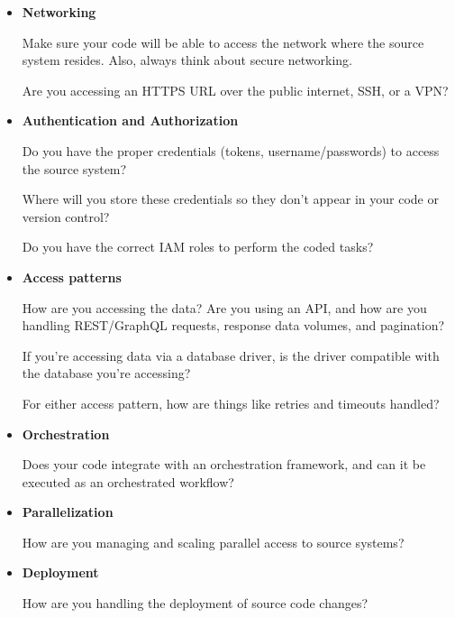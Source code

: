 \begin{itemize}
    \item \textbf{Networking}
    
    \noindent
    Make sure your code will be able to access the network where
    the source system resides. Also, always think about secure
    networking.
    
    Are you accessing an HTTPS URL over the public internet, SSH,
    or a VPN?

    \item \textbf{Authentication and Authorization}
    
    \noindent
    Do you have the proper credentials (tokens, username/passwords)
    to access the source system?
    
    Where will you store these credentials so they don't appear in
    your code or version control?
    
    Do you have the correct IAM roles to perform the coded tasks?

    \item \textbf{Access patterns}
    
    \noindent
    How are you accessing the data? Are you using an API, and how
    are you handling REST/GraphQL requests, response data volumes,
    and pagination?
    
    If you're accessing data via a database driver, is the driver
    compatible with the database you're accessing?
    
    For either access pattern, how are things like retries and
    timeouts handled?
    
    \item \textbf{Orchestration}
    
    \noindent
    Does your code integrate with an orchestration framework,
    and can it be executed as an orchestrated workflow?
    
    \item \textbf{Parallelization}
    
    \noindent
    How are you managing and scaling parallel access to source systems?

    \item \textbf{Deployment}
    
    \noindent
    How are you handling the deployment of source code changes?
\end{itemize}
